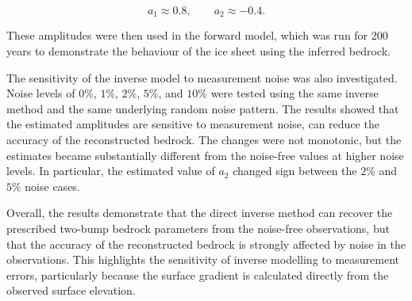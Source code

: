 \documentclass{article}
\begin{document}
\begin{equation}
a_1 \approx 0.8,
\qquad
a_2 \approx -0.4.
\end{equation}

These amplitudes were then used in the forward model, which was run for
200 years to demonstrate the behaviour of the ice sheet using the
inferred bedrock.

The sensitivity of the inverse model to measurement noise was also
investigated. Noise levels of $0\%$, $1\%$, $2\%$, $5\%$, and $10\%$ were
tested using the same inverse method and the same underlying random
noise pattern. The results showed that the estimated amplitudes are
sensitive to measurement noise, can reduce the accuracy of the reconstructed bedrock. The changes were not monotonic, but the
estimates became substantially different from the noise-free values at
higher noise levels. In particular, the estimated value of $a_2$ changed
sign between the $2\%$ and $5\%$ noise cases.

Overall, the results demonstrate that the direct inverse method can
recover the prescribed two-bump bedrock parameters from the
noise-free observations, but that the accuracy of the reconstructed
bedrock is strongly affected by noise in the observations. This
highlights the sensitivity of inverse modelling to measurement errors,
particularly because the surface gradient is calculated directly from
the observed surface elevation.
\end{document}
